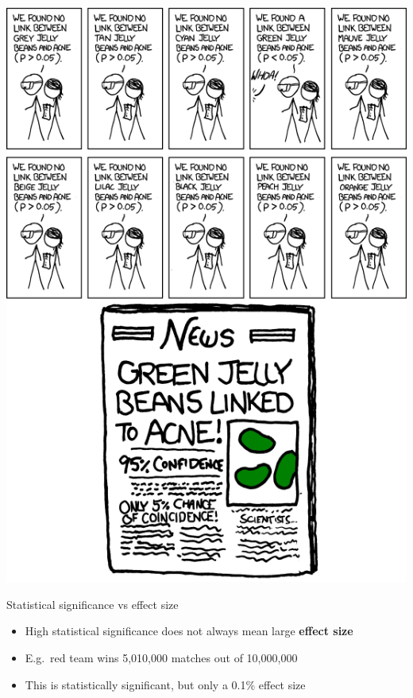 \begin{frame}
	\begin{center}
		\includegraphics[height=0.9\textheight]{xkcd_significant_crop}
	\end{center}	
\end{frame}

\begin{frame}{Statistical significance vs effect size}
	\begin{itemize}
		\pause\item High statistical significance does not always mean large \textbf{effect size}
		\pause\item E.g.\ red team wins 5,010,000 matches out of 10,000,000
		\pause\item This is statistically significant, but only a 0.1\% effect size
	\end{itemize}
\end{frame}

